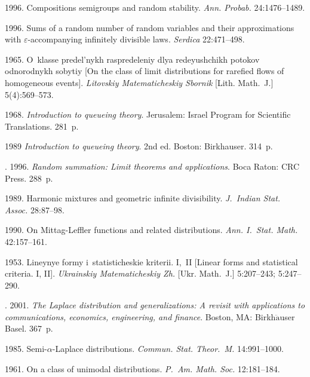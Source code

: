 \begin{multicols}{2}
{{\begin{thebibliography}{99}
 1996. Compositions semigroups and random stability.
\textit{Ann. Probab.} 24:1476--1489.

 1996. Sums of a random number of random
variables and their approximations with $\varepsilon$-accompanying
infinitely divisible laws. \textit{Serdica} 22:471--498.

 1965. O~klasse predel'nykh raspredeleniy dlya
redeyushchikh potokov odnorodnykh sobytiy [On the class of limit
distributions for rarefied flows of homogeneous events].
\textit{Litovskiy Matematicheskiy Sbornik} [Lith. Math.~J.] 5(4):569--573.

 1968. \textit{Introduction to queueing
theory}. Jerusalem: Israel Program for Scientific Translations. 281~p.

 1989 \textit{Introduction to queueing
theory}. 2nd ed. Boston: Birkhauser. 314~p.

. 1996. \textit{ Random summation: Limit
theorems and applications}. Boca Raton: CRC Press. 288~p.

 1989. Harmonic mixtures and geometric
infinite divisibility. \textit{J.~Indian Stat. Assoc.} 28:87--98.

 1990. On Mittag-Leffler functions and related
distributions. \textit{Ann. I.~Stat.
Math.} 42:157--161.

 1953. Lineynye formy i~statisticheskie kriterii. I,~II 
[Linear forms and statistical criteria. I, II]. \textit{Ukrainskiy
Matematicheskiy Zh.} [Ukr. Math.~J.] 5:207--243; 5:247--290.

. 2001. \textit{ The
Laplace distribution and generalizations: A revisit with
applications to communications, economics, engineering, and
finance}. Boston, MA: Birkh$\ddot{\mbox{a}}$user Basel. 367~p.

 1985. Semi-$\alpha$-Laplace distributions. 
\textit{Commun. Stat. Theor.~M.} 14:991--1000.

 1961. On a class of unimodal distributions. \textit{P.~Am. 
Math. Soc.} 12:181--184.


\end{thebibliography}}}
\end{multicols}
